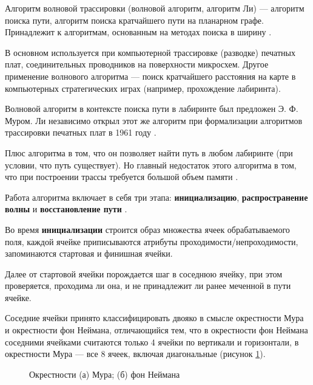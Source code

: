 Алгоритм волновой трассировки (волновой алгоритм, алгоритм Ли) --- алгоритм поиска пути, алгоритм поиска кратчайшего пути на планарном графе. Принадлежит к алгоритмам, основанным на методах поиска в ширину \cite{wiki:li}.

В основном используется при компьютерной трассировке (разводке) печатных плат, соединительных проводников на поверхности микросхем. Другое применение волнового алгоритма --- поиск кратчайшего расстояния на карте в компьютерных стратегических играх \cite{wiki:li} (например, прохождение лабиринта).

Волновой алгоритм в контексте поиска пути в лабиринте был предложен Э. Ф. Муром. Ли независимо открыл этот же алгоритм при формализации алгоритмов трассировки печатных плат в 1961 году \cite{wiki:li}.

Плюс алгоритма в том, что он позволяет найти путь в любом лабиринте (при условии, что путь существует). Но главный недостаток этого алгоритма в том, что при построении трассы требуется большой объем памяти \cite{suv:li}.

Работа алгоритма включает в себя три этапа: \textbf{инициализацию}, \textbf{распространение волны} и \textbf{восстановление пути} \cite{wiki:li}.

Во время \textbf{инициализации} строится образ множества ячеек обрабатываемого поля, каждой ячейке приписываются атрибуты проходимости/непроходимости, запоминаются стартовая и финишная ячейки.

Далее от стартовой ячейки порождается шаг в соседнюю ячейку, при этом проверяется, проходима ли она, и не принадлежит ли ранее меченной в пути ячейке.

Соседние ячейки принято классифицировать двояко в смысле окрестности Мура и окрестности фон Неймана, отличающийся тем, что в окрестности фон Неймана соседними ячейками считаются только 4 ячейки по вертикали и горизонтали, в окрестности Мура --- все 8 ячеек, включая диагональные (рисунок \ref{fig:mooreneim}).

\begin{figure}[ht]
    \qquad
    \caption{Окрестности (а) Мура; (б) фон Неймана}
    \label{fig:mooreneim}
\end{figure}


